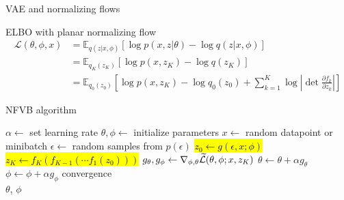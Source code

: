 \documentclass[unicode,11pt]{beamer}
\begin{document}
\begin{frame}{VAE and normalizing flows}
  \centering
\end{frame}


\begin{frame}[fragile]{ELBO with planar normalizing flow}
  \begin{align*}
  \mathcal{L}(\theta, \phi, x) &= \mathbb{E}_{q(z|x, \phi)} \left[ \log p(x, z | \theta) - \log q(z | x, \phi) \right] \\
  &= \mathbb{E}_{q_K(z_K)} \left[ \log p(x, z_K) - \log q(z_K) \right] \\
  &= \mathbb{E}_{q_0(z_0)} \left[ \log p(x, z_K) - \log q_0(z_0) + \sum_{k=1}^K \log \left\vert \det
  \frac{\partial f_k}  {\partial z_k} \right\vert \right]
  \end{align*}
\end{frame}


\begin{frame}[fragile]{NFVB algorithm \cite{rezende2015variational}}
  \begin{algorithmic}
    \State $\alpha \gets$ set learning rate
    \State $\theta, \phi \gets$ initialize parameters
    \Repeat
       \State $x \gets$ random datapoint or minibatch
       \State $\epsilon \gets$ random samples from $p(\epsilon)$
       \hl{\State $z_0 \gets g(\epsilon, x; \phi)$}
       \hl{\State $z_K \gets f_K(f_{K-1}(\cdots f_1(z_0)))$}
       \State $g_\theta, g_\phi \gets \grad_{\phi, \theta} %
           \mathcal{\widetilde{L}}(\theta, \phi; x, z_K)$
       \State $\theta \gets \theta + \alpha g_\theta$
       \State $\phi \gets \phi + \alpha g_\phi$
    \Until convergence \\
    \Return $\theta$, $\phi$
  \end{algorithmic}
\end{frame}
\end{document}
